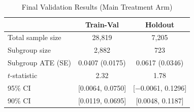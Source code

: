 \begin{table}[ht]
\centering
\caption{Final Validation Results (Main Treatment Arm)}
\label{tab:final_results}
\begin{tabular*}{\columnwidth}{@{\extracolsep\fill}lcc@{\extracolsep\fill}}
\toprule
& \textbf{Train-Val} & \textbf{Holdout} \\
\midrule
Total sample size & 28,819 & 7,205 \\
Subgroup size & 2,882 & 723 \\
Subgroup ATE (SE) & 0.0407 (0.0175) & 0.0617 (0.0346) \\
$t$-statistic & 2.32 & 1.78 \\
95\% CI & [0.0064, 0.0750] & [$-$0.0061, 0.1296] \\
90\% CI & [0.0119, 0.0695] & [0.0048, 0.1187] \\
\bottomrule
\end{tabular*}
\end{table}
